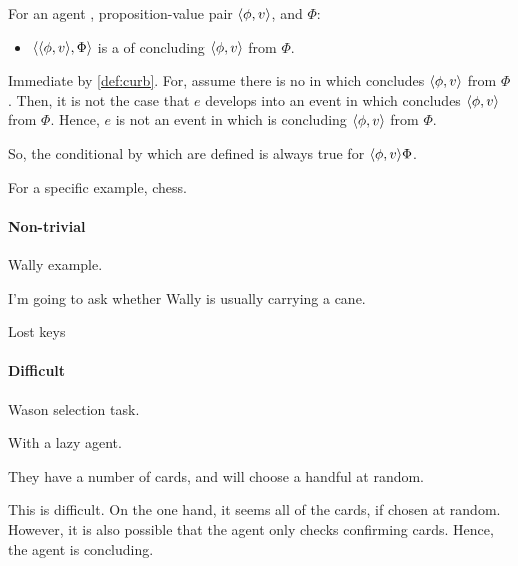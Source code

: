 \begin{note}
  \begin{proposition}
    For an agent \vAgent{}, proposition-value pair \(\langle \phi, v \rangle\), and \poP{} \(\Phi\):

    \begin{itemize}
    \item
      \(\langle \langle \phi, v \rangle, \Phi \rangle\) is a \curb{} of \vAgent{} concluding \(\langle \phi, v \rangle\) from \(\Phi\).
    \end{itemize}
    \begin{argument}
      Immediate by \autoref{def:curb}.
      For, assume there is no \pevent{} in which \vAgent{} concludes \(\langle \phi, v \rangle\) from \(\Phi\).
      Then, it is not the case that \(e\) develops into an event in which \vAgent{} concludes \(\langle \phi, v \rangle\) from \(\Phi\).
      Hence, \(e\) is not an event in which \vAgent{} is concluding \(\langle \phi, v \rangle\) from \(\Phi\).

      So, the conditional by which  are defined is always true for \(\langle \phi, v \rangle{\Phi}\).
    \end{argument}
  \end{proposition}

  For a specific example, chess.
\end{note}

\paragraph{Non-trivial}

\begin{note}
  Wally example.

  I'm going to ask whether Wally is usually carrying a cane.
\end{note}

\begin{note}
  Lost keys
\end{note}

\paragraph{Difficult}

\begin{note}
  Wason selection task.

  With a lazy agent.

  They have a number of cards, and will choose a handful at random.

  This is difficult.
  On the one hand, it seems all of the cards, if chosen at random.
  However, it is also possible that the agent only checks confirming cards.
  Hence, the agent is concluding.
\end{note}

